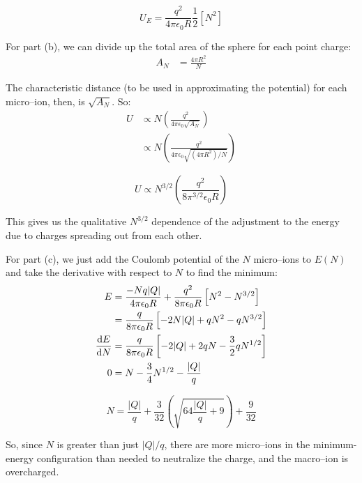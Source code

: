 \documentclass{article}
\begin{document}
\begin{equation}
	\boxed{U_E = \frac{q^2}{4\pi\epsilon_0 R}\frac{1}{2}\left[N^2\right]}\tag{3.25a}\label{eq:3.25a}
\end{equation}
	
For part (b), we can divide up the total area of the sphere for each point charge:
\[
\begin{aligned}
	A_N &= \frac{4\pi R^2}{N}
\end{aligned}
\]


The characteristic distance (to be used in approximating the potential) for each micro--ion, then, is $\sqrt{A_N}$. So:
\[
\begin{aligned}
	U &\propto N\left(\frac{q^2}{4\pi\epsilon_0\sqrt{A_N}}\right) \\
	&\propto N\left(\frac{q^2}{4\pi\epsilon_0\sqrt{(4\pi R^2)/N}}\right)
\end{aligned}
\]

\begin{equation}
	\boxed{U \propto N^{3/2}\left(\frac{q^2}{8\pi^{3/2}\epsilon_0 R}\right)}\tag{3.25b}\label{eq:3.25b}
\end{equation}

This gives us the qualitative $N^{3/2}$ dependence of the adjustment to the energy due to charges spreading out from each other.

For part (c), we just add the Coulomb potential of the $N$ micro--ions to $E(N)$ and take the derivative with respect to $N$ to find the minimum:
\[
\begin{aligned}
	E &= \frac{-Nq|Q|}{4\pi\epsilon_0R} + \frac{q^2}{8\pi\epsilon_0R}\left[N^2 - N^{3/2}\right] \\
	&= \frac{q}{8\pi\epsilon_0 R}\left[-2N|Q| + qN^2 - qN^{3/2}\right] \\
	\dv{E}{N} &= \frac{q}{8\pi\epsilon_0 R}\left[-2|Q| + 2qN - \frac{3}{2}qN^{1/2}\right] \\
	0 &= N - \frac{3}{4}N^{1/2} - \frac{|Q|}{q}
\end{aligned}
\]

\begin{equation}
	\boxed{N = \frac{|Q|}{q} + \frac{3}{32}\left(\sqrt{64\frac{|Q|}{q} + 9}\right) + \frac{9}{32}}\tag{3.25c}\label{eq:3.25c}
\end{equation}

So, since $N$ is greater than just $|Q|/q$, there are more micro--ions in the minimum-energy configuration than needed to neutralize the charge, and the macro--ion is overcharged.
\end{document}
